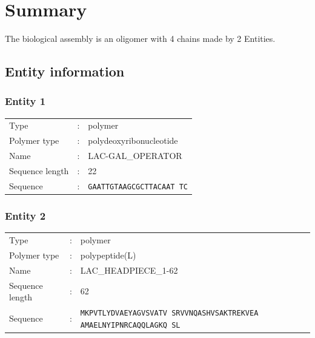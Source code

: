 \newpage
\pagestyle{fancy}
\renewcommand{\footrulewidth}{0pt}
\section{Summary}
The biological assembly is an oligomer with 4 chains made by 2 Entities.\\
\subsection{ Entity information}
\subsubsection{ Entity 1 }
\begin{longtable}{l l l}
Type &:& polymer\\
Polymer type &:& polydeoxyribonucleotide\\
Name &:& LAC-GAL\_OPERATOR\\
Sequence length &:& 22\\
Sequence &:& \multicolumn{1}{p{0.25\linewidth}}{\texttt{GAATTGTAAGCGCTTACAAT TC}}\\
\end{longtable}
\subsubsection{ Entity 2 }
\begin{longtable}{l l l}
Type &:& polymer\\
Polymer type &:& polypeptide(L)\\
Name &:& LAC\_HEADPIECE\_1-62\\
Sequence length &:& 62\\
Sequence &:& \multicolumn{1}{p{0.25\linewidth}}{\texttt{MKPVTLYDVAEYAGVSVATV SRVVNQASHVSAKTREKVEA AMAELNYIPNRCAQQLAGKQ SL}}\\
\end{longtable}

